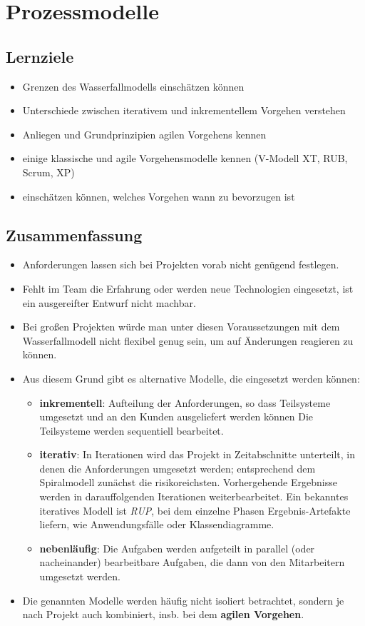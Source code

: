 \section*{Prozessmodelle}

\subsection*{Lernziele}
\begin{itemize}
    \item Grenzen des Wasserfallmodells einschätzen können
    \item Unterschiede zwischen iterativem und inkrementellem Vorgehen verstehen
    \item Anliegen und Grundprinzipien agilen Vorgehens kennen
    \item einige klassische und agile Vorgehensmodelle kennen (V-Modell XT, RUB, Scrum, XP)
    \item einschätzen können, welches Vorgehen wann zu bevorzugen ist
\end{itemize}

\subsection*{Zusammenfassung}

\begin{itemize}
    \item Anforderungen lassen sich bei Projekten vorab nicht genügend festlegen.
    \item Fehlt im Team die Erfahrung oder werden neue Technologien eingesetzt, ist ein ausgereifter Entwurf nicht machbar.
    \item Bei großen Projekten würde man unter diesen Voraussetzungen mit dem Wasserfallmodell nicht flexibel genug sein,
    um auf Änderungen reagieren zu können.
    \item Aus diesem Grund gibt es alternative Modelle, die eingesetzt werden können:
    \begin{itemize}
        \item \textbf{inkrementell}: Aufteilung der Anforderungen, so dass Teilsysteme umgesetzt und an den Kunden ausgeliefert werden können
        Die Teilsysteme werden sequentiell bearbeitet.
        \item \textbf{iterativ}: In Iterationen wird das Projekt in Zeitabschnitte unterteilt, in denen die Anforderungen umgesetzt werden; entsprechend dem Spiralmodell zunächst die risikoreichsten.
        Vorhergehende Ergebnisse werden in darauffolgenden Iterationen weiterbearbeitet.
        Ein bekanntes iteratives Modell ist \textit{RUP}, bei dem einzelne Phasen Ergebnis-Artefakte liefern, wie Anwendungsfälle oder Klassendiagramme.
        \item \textbf{nebenläufig}: Die Aufgaben werden aufgeteilt in parallel (oder nacheinander) bearbeitbare Aufgaben, die dann von den Mitarbeitern umgesetzt werden.
    \end{itemize}
    \item Die genannten Modelle werden häufig nicht isoliert betrachtet, sondern je nach Projekt auch kombiniert, insb. bei dem \textbf{agilen Vorgehen}.
\end{itemize}

